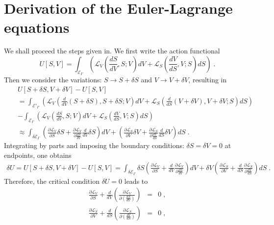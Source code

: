 \documentclass[12pt]{article}
\numberwithin{equation}{section}
\theoremstyle{remark}
\theoremstyle{definition}
\begin{document}
	\section{Derivation of the Euler-Lagrange equations} \label{AppendixA}
We shall proceed the steps given in\cite{Yookong1,Yookong2}. We first write the action functional
\begin{equation}
    U[S,V]=\int_{\mathscr{E}_\Gamma} \left(\mathcal{L}_V\left(\frac{dS}{dV},S;V\right)dV+\mathcal{L}_S\left(\frac{dV}{dS},V;S\right)dS\right)\;.
\end{equation}
Then we consider the variations: $S\rightarrow S+\delta S$ and $V\rightarrow V+\delta V$, resulting in
\begin{eqnarray}
    && U[S+\delta S,V+\delta V]-U[S,V]\nonumber\\
    &&=\int_{\mathscr{E}'_\Gamma}\left(\mathcal{L}_V\left(\frac{d}{dV}(S+\delta S),S+\delta S;V\right)dV+\mathcal{L}_S\left(\frac{d}{dS}(V+\delta V),V+\delta V;S\right)dS\right)\nonumber\\
    &&-\int_{\mathscr{E}_\Gamma} \left(\mathcal{L}_V\left(\frac{dS}{dV},S;V\right)dV+\mathcal{L}_S\left(\frac{dV}{dS},V;S\right)dS\right)\nonumber\\
    &&\approx \int_{\delta\mathscr{E}_\Gamma}\left(\frac{\partial \mathcal{L}_V}{\partial S}\delta S+\frac{\partial \mathcal{L}_V}{\partial \frac{dS}{dV}}\frac{d}{dV}\delta S \right)dV
    +\left(\frac{\partial \mathcal{L}_S}{\partial V}\delta V+\frac{\partial \mathcal{L}_S}{\partial \frac{dV}{dS}}\frac{d}{dS}\delta V \right)dS\;.
\end{eqnarray}
Integrating by parts and imposing the boundary conditions: $\delta S=\delta V=0$ at endpoints, one obtains
\begin{eqnarray}
    \delta U=U[S+\delta S,V+\delta V]-U[S,V]=\int_{\delta\mathscr{E}_\Gamma}\delta S\left(\frac{\partial \mathcal{L}_V}{\partial S}+\frac{d}{dV}\frac{\partial \mathcal{L}_V}{\partial \frac{dS}{dV}}\right)dV+\delta V\left(\frac{\partial \mathcal{L}_S}{\partial V}+\frac{d}{dS}\frac{\partial \mathcal{L}_S}{\partial \frac{dV}{dS}}\right)dS\;.
\end{eqnarray}
Therefore, the critical condition $\delta U=0$ leads to
\begin{eqnarray}
    \frac{\partial \mathcal{L}_V}{\partial S}+\frac{d}{dV}\left(\frac{\partial \mathcal{L}_V}{\partial \left(\frac{dS}{dV}\right)}\right)&=&0\;,\\
    \frac{\partial \mathcal{L}_S}{\partial V}+\frac{d}{dS}\left(\frac{\partial \mathcal{L}_S}{\partial \left(\frac{dV}{dS}\right)}\right)&=&0\;,
\end{eqnarray}
\end{document}
